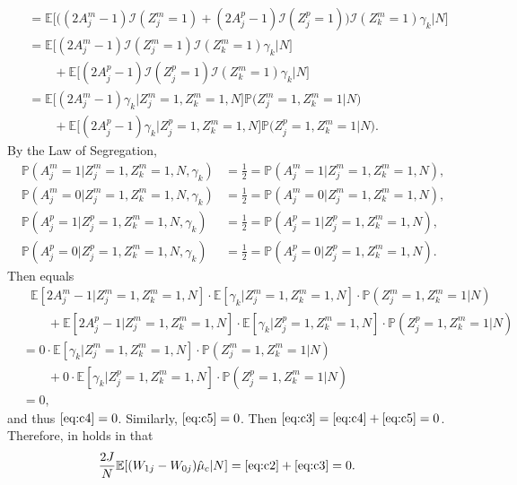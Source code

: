 \documentclass[12pt]{extarticle}
\newcommand{\pp}{\mathbb{P}}
\newcommand{\E}{\mathbb{E}}
\newcommand{\nind}{J}
\newcommand{\indicator}{\mathcal{I}}
\begin{document}
{{\begin{align}
& = \E\Big[\big((2A^m_j-1)\indicator(Z^m_j=1)+(2A^p_j-1)\indicator(Z^p_j=1)\big)\indicator(Z^m_k=1)\gamma_k \Big|N\Big] \nonumber \\
& = \E\Big[(2A^m_j-1)\indicator(Z^m_j=1)\indicator(Z^m_k=1)\gamma_k \Big|N\Big] \nonumber \\
& \qquad + \E\Big[(2A^p_j-1)\indicator(Z^p_j=1)\indicator(Z^m_k=1)\gamma_k \Big|N\Big] \nonumber \\
& = \E\Big[(2A^m_j-1)\gamma_k\Big|Z^m_j=1,Z^m_k=1,N\Big]\pp\Big(Z^m_j=1,Z^m_k=1\Big|N\Big) \nonumber \\
& \qquad + \E\Big[(2A^p_j-1)\gamma_k\Big|Z^p_j=1,Z^m_k=1,N\Big]\pp\Big(Z^p_j=1,Z^m_k=1\Big|N\Big). \tag{A5.f} \label{eq:c6}
\end{align}}
By the Law of Segregation, 
{\allowdisplaybreaks \begin{align*}
\pp(A^m_j=1|Z^m_j=1,Z^m_k=1,N,\gamma_k) &= \frac{1}{2} = \pp(A^m_j=1|Z^m_j=1,Z^m_k=1,N), \nonumber \\
\pp(A^m_j=0|Z^m_j=1,Z^m_k=1,N,\gamma_k) &= \frac{1}{2} = \pp(A^m_j=0|Z^m_j=1,Z^m_k=1,N), \nonumber \\
\pp(A^p_j=1|Z^p_j=1,Z^m_k=1,N,\gamma_k) &= \frac{1}{2} = \pp(A^p_j=1|Z^p_j=1,Z^m_k=1,N), \nonumber \\
\pp(A^p_j=0|Z^p_j=1,Z^m_k=1,N,\gamma_k) &= \frac{1}{2} = \pp(A^p_j=0|Z^p_j=1,Z^m_k=1,N).
\end{align*}}
Then  equals
{\allowdisplaybreaks \begin{align*}
&~~~ \E[2A^m_j-1|Z^m_j=1,Z^m_k=1,N]\cdot \E[\gamma_k|Z^m_j=1,Z^m_k=1,N] \cdot \pp(Z^m_j=1,Z^m_k=1|N) \nonumber \\
& \qquad + \E[2A^p_j-1|Z^m_j=1,Z^m_k=1,N]\cdot \E[\gamma_k|Z^p_j=1,Z^m_k=1,N] \cdot \pp(Z^p_j=1,Z^m_k=1|N) \nonumber \\
& = 0 \cdot \E[\gamma_k|Z^m_j=1,Z^m_k=1,N] \cdot \pp(Z^m_j=1,Z^m_k=1|N) \nonumber \\
& \qquad + 0 \cdot \E[\gamma_k|Z^p_j=1,Z^m_k=1,N] \cdot \pp(Z^p_j=1,Z^m_k=1|N) \nonumber \\
& = 0,
\end{align*}}and thus $\text{\Cref{eq:c4}}=0$. Similarly, $\text{\Cref{eq:c5}}=0$. Then $\text{\Cref{eq:c3}}=\text{\Cref{eq:c4}} + \text{\Cref{eq:c5}} = 0$. Therefore,  in  holds in that  
{\allowdisplaybreaks \begin{align*}
& \frac{2\nind}{N}\E[(W_{1j}-W_{0j})\hat{\mu}_c|N] = \text{\Cref{eq:c2}} + \text{\Cref{eq:c3}} = 0.
\end{align*}}

}
\end{document}
